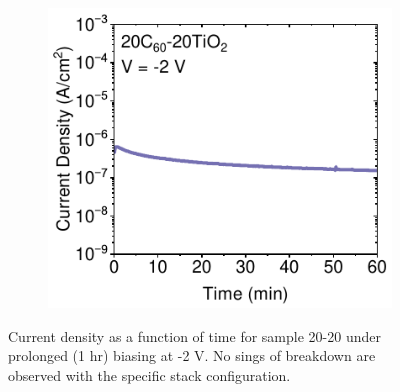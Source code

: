 \begin{figure}[htbp]
    \centering
    \begin{subfigure}[t]{0.5\textwidth}
        \centering
        \includegraphics[width=\textwidth]{chapters/transport_layers/images/JV_1hr_20_20.pdf} %
                
    \end{subfigure}

    \caption[Current density as a function of time for sample 20-20 under prolonged (1 hr) biasing at -2 V.]{Current density as a function of time for sample 20-20 under prolonged (1 hr) biasing at -2 V. No sings of breakdown are observed with the specific stack configuration.}
    \label{fig:et_optim:1hr_stability}
\end{figure}


